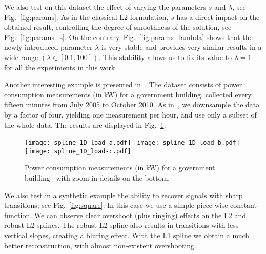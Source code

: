 \documentclass[preprint]{imsart}
\begin{document}
We also test on this dataset the effect of varying the parameters $s$ and $\lambda$, see Fig.~\ref{fig:params}. As in the classical L2 formulation, $s$ has a direct impact on the obtained result, controlling the degree of smoothness of the solution, see Fig.~\ref{fig:params_s}. On the contrary, Fig.~\ref{fig:params_lambda} shows that the newly introduced parameter $\lambda$ is very stable and provides very similar results in a wide range $(\lambda \in [0.1, 100])$. This stability allows us to fix its value to $\lambda=1$ for all the experiments in this work.

\begin{figure*}
    \centering
{}




    \caption{Changing the value of $s$ in L1 splines controls the trade-off between fitting and smoothing. L1 splines are quite insensitive to the value of $\lambda$, making it easy to tune.}
    \label{fig:params}
\end{figure*}

Another interesting example is presented in~\cite{mateos12}. The dataset consists of power consumption measurements (in kW) for a government building, collected every fifteen minutes from July 2005 to October 2010. As in~\cite{mateos12}, we downsample the data by a factor of four, yielding one measurement per hour, and use only a subset of the whole data. The results are displayed in Fig.~\ref{fig:load}.

\begin{figure}
    
    \centerline{
        \hfill
        \texttt{[image: spline\_1D\_load-a.pdf]}
        \hfill
        \texttt{[image: spline\_1D\_load-b.pdf]}
        \hfill
        \texttt{[image: spline\_1D\_load-c.pdf]}
        \hfill
    }
    \caption{Power consumption measurements (in kW) for a government building~\protect\cite{mateos12} with zoom-in details on the bottom.}
    \label{fig:load}
\end{figure}

We also test in a synthetic example the ability to recover signals with sharp transitions, see Fig.~\ref{fig:square}. In this case we use a simple piece-wise constant function. We can observe clear overshoot (plus ringing) effects on the L2 and robust L2 splines. The robust L2 spline also results in transitions with less vertical slopes, creating a bluring effect. With the L1 spline we obtain a much better reconstruction, with almost non-existent overshooting.
\end{document}
